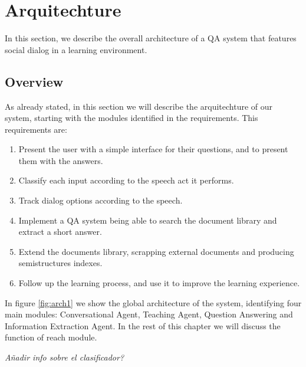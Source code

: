 \chapter{Arquitechture}
\label{chap:architecture}

\begin{chapterintro}

In this section, we describe the overall architecture of a QA system that features social dialog in a learning environment.
 
\end{chapterintro}

\cleardoublepage

\section{Overview}

As already stated, in this section we will describe the arquitechture of our system, starting with the modules identified in the requirements. This requirements are:
\begin{enumerate}[noitemsep, label=(\roman*)]
 \item Present the user with a simple interface for their questions, and to present them with the answers.
 \item Classify each input according to the speech act it performs.
 \item Track dialog options according to the speech.
 \item Implement a QA system being able to search the document library and extract a short answer.
 \item Extend the documents library, scrapping external documents and producing semistructures indexes.
 \item Follow up the learning process, and use it to improve the learning experience. 
\end{enumerate}

In figure \ref{fig:arch1} we show the global architecture of the system, identifying four main modules: Conversational Agent, Teaching Agent, Question Answering and Information Extraction Agent. In the rest of this chapter we will discuss the function of reach module.

\color{red}\emph{Añadir info sobre el clasificador?}\color{black}



